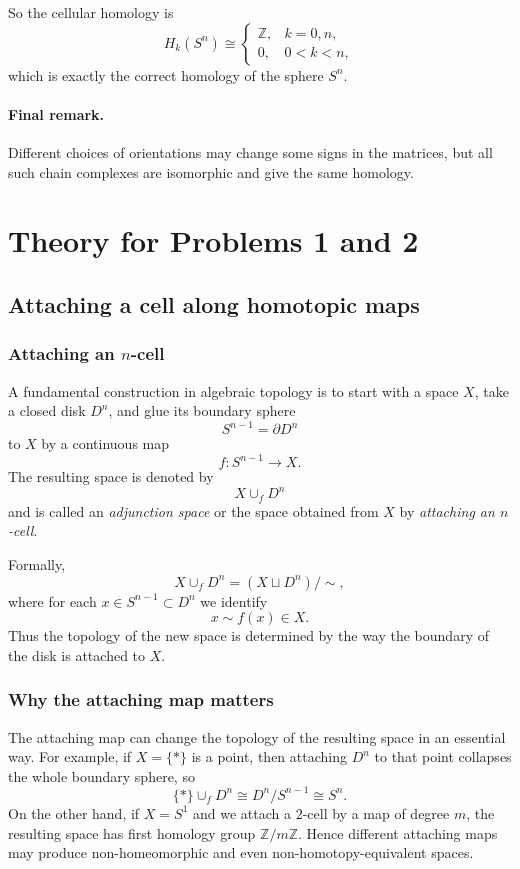 \documentclass[12pt,a4paper]{article}
\theoremstyle{notespace}
\begin{document}
So the cellular homology is
\[
H_k(S^n)\cong
\begin{cases}
	\mathbb Z, & k=0,n,\\[4pt]
	0, & 0<k<n,
\end{cases}
\]
which is exactly the correct homology of the sphere \(S^n\).

\paragraph{Final remark.}
Different choices of orientations may change some signs in the matrices, but all such chain complexes are isomorphic and give the same homology.


\section{Theory for Problems 1 and 2}

\subsection{Attaching a cell along homotopic maps}

\subsubsection{Attaching an \(n\)-cell}

A fundamental construction in algebraic topology is to start with a space \(X\), take a closed disk \(D^n\), and glue its boundary sphere
\[
S^{n-1}=\partial D^n
\]
to \(X\) by a continuous map
\[
f:S^{n-1}\to X.
\]
The resulting space is denoted by
\[
X\cup_f D^n
\]
and is called an \emph{adjunction space} or the space obtained from \(X\) by \emph{attaching an \(n\)-cell}.

Formally,
\[
X\cup_f D^n=(X\sqcup D^n)/\sim,
\]
where for each \(x\in S^{n-1}\subset D^n\) we identify
\[
x\sim f(x)\in X.
\]
Thus the topology of the new space is determined by the way the boundary of the disk is attached to \(X\).

\subsubsection{Why the attaching map matters}

The attaching map can change the topology of the resulting space in an essential way. For example, if \(X=\{*\}\) is a point, then attaching \(D^n\) to that point collapses the whole boundary sphere, so
\[
\{*\}\cup_f D^n \cong D^n/S^{n-1}\cong S^n.
\]
On the other hand, if \(X=S^1\) and we attach a \(2\)-cell by a map of degree \(m\),
the resulting space has first homology group \(\mathbb Z/m\mathbb Z\). Hence different attaching maps may produce non-homeomorphic and even non-homotopy-equivalent spaces.
\end{document}
